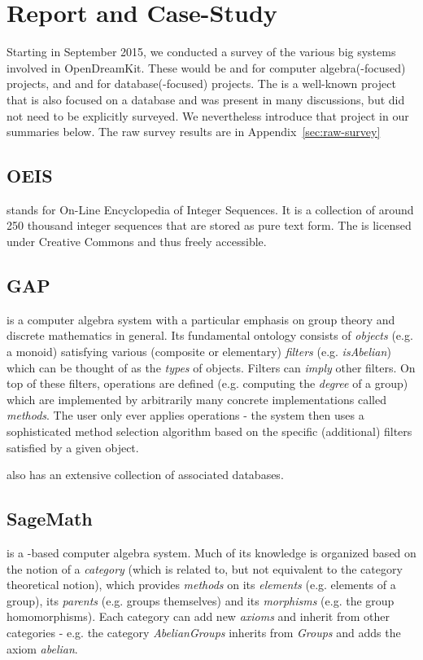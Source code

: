 \section{Report and Case-Study}\label{sec:survey}

Starting in September 2015, we conducted a survey of the various big systems involved in OpenDreamKit. These would be \SageMath and \GAP for computer algebra(-focused) projects, and \FindStat and \LMFDB for database(-focused) projects. The \OEIS is a well-known project that is also focused on a database and was present in many discussions, but did not need to be explicitly surveyed. We nevertheless introduce that project in our summaries below. The raw survey results are in Appendix~\ref{sec:raw-survey}


\subsection{OEIS}
\OEIS \cite{oeis} stands for On-Line Encyclopedia of Integer Sequences. It is a collection
of around 250 thousand integer sequences that are stored as pure text form. The \OEIS is
licensed under Creative Commons and thus freely accessible.

\subsection{GAP} 
\GAP \cite{gap} is a computer algebra system with a particular emphasis on group theory and discrete mathematics in general. Its fundamental
ontology consists of \emph{objects} (e.g. a monoid) satisfying various (composite or elementary) \emph{filters} (e.g. \emph{isAbelian}) which
can be thought of as the \emph{types} of objects. Filters can \emph{imply} other filters.
On top of these filters, operations are defined (e.g. computing the \emph{degree} of a group) which are implemented by arbitrarily many concrete implementations
called \emph{methods}. The user only ever applies operations - the \GAP system then uses a sophisticated method selection algorithm based on
the specific (additional) filters satisfied by a given object.

\GAP also has an extensive collection of associated databases. 

\subsection{SageMath}
\SageMath \cite{sagemath} is a \python-based computer algebra system. Much of its knowledge is organized based on the notion of a \emph{category} (which is related to, but not equivalent to the category theoretical notion),
which provides \emph{methods} on its \emph{elements} (e.g. elements of a group), its \emph{parents} (e.g. groups themselves) and its \emph{morphisms}
(e.g. the group homomorphisms). Each category can add new \emph{axioms} and inherit from other categories - e.g. the category \emph{AbelianGroups} inherits from \emph{Groups} and adds the axiom \emph{abelian}.

